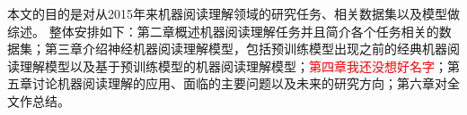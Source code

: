 本文的目的是对从2015年来机器阅读理解领域的研究任务、相关数据集以及模型做综述。
整体安排如下：第二章概述机器阅读理解任务并且简介各个任务相关的数据集；第三章介绍神经机器阅读理解模型，包括预训练模型出现之前的经典机器阅读理解模型以及基于预训练模型的机器阅读理解模型；\textcolor{red}{第四章我还没想好名字}；第五章讨论机器阅读理解的应用、面临的主要问题以及未来的研究方向；第六章对全文作总结。
%
%
%
%
%

